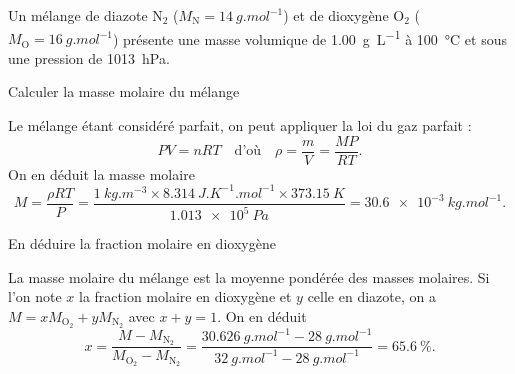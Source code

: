 \hauteurLargeurCadreReponse		{6mm}{4cm}
\initialisationEntrainement

Un mélange de diazote $\mathrm{N_2}$ ($M_\mathrm{N}=\SI{14}{g.mol^{-1}}$) et de dioxygène $\mathrm{O_2}$ ($M_\mathrm{O}=\SI{16}{g.mol^{-1}}$) présente une masse volumique de \SI{1,00}{g.L^{-1}} à \SI{100}{\celsius} et sous une pression de \SI{1013}{hPa}.

\debutEntrainement

\begin{enonce}
Calculer la masse molaire du mélange
\end{enonce}


\begin{corrige}
Le mélange étant considéré parfait, on peut appliquer la loi du gaz parfait : 
\[
PV=nRT
\quad\text{d'où}\quad
\rho=\frac{m}{V}=\frac{MP}{RT}.
\]
On en déduit la masse molaire
\[
M=\frac{\rho RT}{P}=
\frac{\SI{1}{kg.m^{-3}}\times \SI{8,314}{J.K^{-1}.mol^{-1}} \times \SI{373,15}{K}}{\SI{1.013e5}{Pa}}=\SI{30.6e-3}{kg.mol^{-1}}.
\]
\end{corrige}



\begin{enonce}
En déduire la fraction molaire en dioxygène
\end{enonce}


\begin{corrige}
La masse molaire du mélange est la moyenne pondérée des masses molaires. Si l'on note $x$ la fraction molaire en dioxygène et $y$ celle en diazote, on a $M=xM_\mathrm{O_2}+yM_\mathrm{N_2}$ avec $x+y=1$. On en déduit 
\[
x=\frac{M-M_\mathrm{N_2}}{M_\mathrm{O_2}-M_\mathrm{N_2}}=\frac{\SI{30.626}{g.mol^{-1}}-\SI{28}{g.mol^{-1}}}{\SI{32}{g.mol^{-1}}-\SI{28}{g.mol^{-1}}}=\SI{65,6}{\percent}.
\]
\end{corrige}

